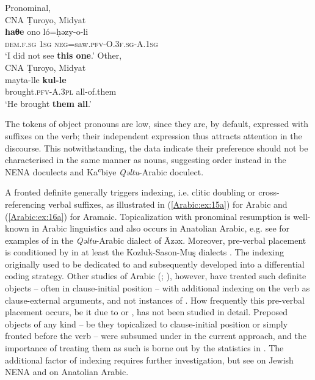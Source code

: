 \documentclass[output=paper,colorlinks,citecolor=brown,draftmode]{langscibook}
\begin{document}
\newpage
\ex\label{Arabic:ex:16c}
Pronominal, \\
CNA Ṭuroyo, Midyat \citep[83:§50]{Ritter1967Turoyo} \\
\gll \textbf{haθe} ono ló=ḥəzy-o-li \\
     \textsc{dem.f.sg} \textsc{1sg} \textsc{neg=}saw\textsc{.pfv}\textsc{-O.3f.sg}\textsc{-A.1sg} \\
\glt `I did not see \textbf{this one}.'
\ex\label{Arabic:ex:16d}
Other, \\
CNA Ṭuroyo, Midyat \citep[27:§54]{Ritter1967Turoyo} \\
\gll mayta-lle \textbf{kul-le} \\
     brought\textsc{.pfv-A.3pl} all-of.them \\
\glt `He brought \textbf{them all}.'
\z
\z

The tokens of object pronouns are low, since they are, by default, expressed with  suffixes on the verb; their independent expression thus attracts attention in the discourse. This notwithstanding, the data indicate their  preference should not be characterised in the same manner as nouns, suggesting  order instead in the NENA doculects and Kaʿbiye \textit{Qəltu}-Arabic doculect. 

A fronted definite  generally triggers  indexing, i.e. clitic doubling or cross-referencing verbal  suffixes, as illustrated in (\ref{Arabic:ex:15a}) for Arabic and (\ref{Arabic:ex:16a}) for Aramaic. Topicalization with pronominal resumption is well-known in Arabic linguistics and also occurs in Anatolian Arabic, e.g. see \citet[164--165]{Wittrich2001AAzex} for examples of  in the \textit{Qəltu}-Arabic dialect of Āzəx. Moreover, pre-verbal placement is conditioned by  in at least the Kozluk-Sason-Muş dialects \citep{Akkus2017PArabic}. The  indexing originally used to be dedicated to  and subsequently developed into a differential  coding strategy. Other studies of Arabic  (\citealt{Dahlgren1998WOA}; \citealt{ElZarkaZiagos2020WOCA}), however, have treated such definite objects -- often in clause-initial position -- with additional  indexing on the verb as clause-external arguments, and not instances of .  How frequently this pre-verbal placement occurs, be it due to  or , has not been studied in detail. Preposed objects of any kind -- be they topicalized to clause-initial position or simply fronted before the verb -- were subsumed under  in the current approach, and the importance of treating them as such is borne out by the statistics in . The additional factor of  indexing requires further investigation, but see \citet{NoorlanderMolin2022WordOrder} on Jewish NENA and \citet{Noorlander2024OVArabi} on Anatolian Arabic.
\end{document}

